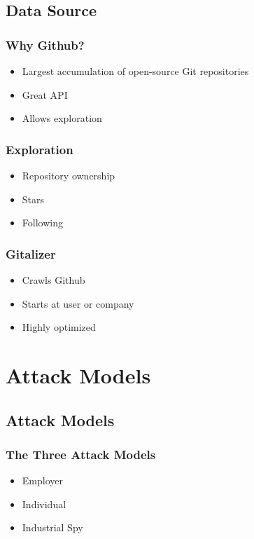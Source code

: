 \documentclass{beamer}
\begin{document}
\subsection{Data Source}
\begin{frame}
    \frametitle{Why Github?}
    \begin{itemize}
        \item Largest accumulation of open-source Git repositories
        \pause{}
        \item Great API
        \pause{}
        \item Allows exploration
    \end{itemize}
\end{frame}

\begin{frame}
    \frametitle{Exploration}
    \begin{itemize}
        \item Repository ownership
        \item Stars
        \item Following
    \end{itemize}
\end{frame}


\begin{frame}
    \frametitle{Gitalizer}
    \begin{itemize}
        \item Crawls Github
        \item Starts at user or company
        \item Highly optimized
    \end{itemize}
\end{frame}

\section{Attack Models}
\subsection{Attack Models}
\begin{frame}
    \frametitle{The Three Attack Models}
    \begin{itemize}
        \item Employer
        \pause{}
        \item Individual
        \pause{}
        \item Industrial Spy
    \end{itemize}
\end{frame}
\end{document}
